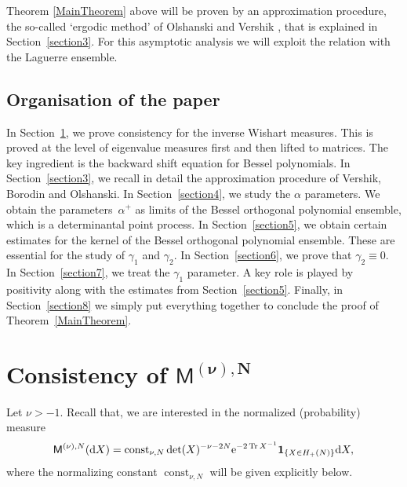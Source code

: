 \documentclass[pdftex]{sigma}
\numberwithin{equation}{section}
\begin{document}
Theorem \ref{MainTheorem} above will be proven by an approximation procedure, the so-called `ergodic method' of Olshanski and Vershik \cite{OlshanskiVershik}, that is explained in Section~\ref{section3}. For this asymptotic analysis we will exploit the relation with the Laguerre ensemble.

\subsection{Organisation of the paper}\label{section1.5}

In Section~\ref{section2}, we prove consistency for the inverse Wishart measures. This is proved at the level of eigenvalue measures first and then lifted to matrices. The key ingredient is the backward shift equation for Bessel polynomials. In Section~\ref{section3}, we recall in detail the approximation procedure of Vershik, Borodin and Olshanski. In Section~\ref{section4}, we study the $\alpha$ parameters. We obtain the parameters~$\alpha^+$ as limits of the Bessel orthogonal polynomial ensemble, which is a determinantal point process. In Section~\ref{section5}, we obtain certain estimates for the kernel of the Bessel orthogonal polynomial ensemble. These are essential for the study of $\gamma_1$ and $\gamma_2$. In Section~\ref{section6}, we prove that $\gamma_2 \equiv 0$. In Section~\ref{section7}, we treat the $\gamma_1$ parameter. A key role is played by positivity along with the estimates from Section~\ref{section5}. Finally, in Section~\ref{section8} we simply put everything together to conclude the proof of Theorem~\ref{MainTheorem}.

\section[Consistency of $\mathsf{M}^{(\nu),N}$]{Consistency of $\boldsymbol{\mathsf{M}^{(\nu),N}}$}\label{section2}

Let $\nu>-1$. Recall that, we are interested in the normalized (probability) measure
\begin{gather*}
\mathsf{M}^{(\nu),N}({\rm d}X)= \operatorname{const}_{\nu, N} \det(X)^{-\nu-2N} {\rm e}^{-2\operatorname{Tr}X^{-1}}\mathbf{1}_{\{X \in H_+(N)\}}{\rm d}X,
\end{gather*}
where the normalizing constant $\operatorname{const}_{\nu, N}$ will be given explicitly below.
\end{document}
